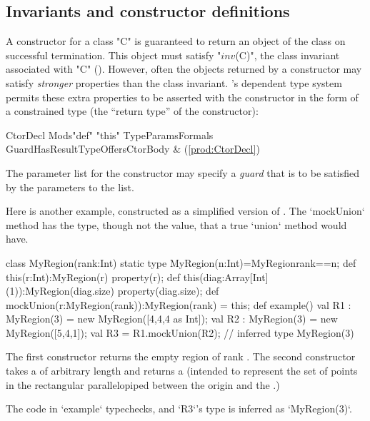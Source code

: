 \subsection{Invariants and constructor definitions}

A constructor for a class \xcd"C" is guaranteed to return an object of the
class on successful termination. This object must satisfy  \xcdmath"$\mathit{inv}$(C)", the
class invariant associated with \xcd"C" ().
However,
often the objects returned by a constructor may satisfy {\em stronger}
properties than the class invariant. \Xten{}'s dependent type system
permits these extra properties to be asserted with the constructor in
the form of a constrained type (the ``return type'' of the constructor):

\begin{bbgrammar}
            CtorDecl \: Mods\opt \xcd"def" \xcd"this" TypeParams\opt Formals Guard\opt HasResultType\opt Offers\opt CtorBody & (\ref{prod:CtorDecl}) \\
\end{bbgrammar}

\label{ConstructorGuard}

The parameter list for the constructor
may specify a \emph{guard} that is to be satisfied by the parameters
to the list.

\begin{ex}
Here is another example, constructed as a simplified 
version of .  The \xcd`mockUnion` method 
has the type, though not the value, that a true \xcd`union` method would have.

\begin{xten}
class MyRegion(rank:Int) {
  static type MyRegion(n:Int)=MyRegion{rank==n};
  def this(r:Int):MyRegion(r) {
    property(r);
  }
  def this(diag:Array[Int](1)):MyRegion(diag.size){ 
    property(diag.size);
  }
  def mockUnion(r:MyRegion(rank)):MyRegion(rank) = this;
  def example() {
    val R1 : MyRegion(3) = new MyRegion([4,4,4 as Int]); 
    val R2 : MyRegion(3) = new MyRegion([5,4,1]); 
    val R3 = R1.mockUnion(R2); // inferred type MyRegion(3)
  }
}
\end{xten}
%
The first constructor returns the empty region of rank .  The
second constructor takes a  of arbitrary length
 and returns a  (intended to represent the set
of points in the rectangular parallelopiped between the origin and the
.)

The code in \xcd`example` typechecks, and \xcd`R3`'s type is inferred as
\xcd`MyRegion(3)`.  


\end{ex}

